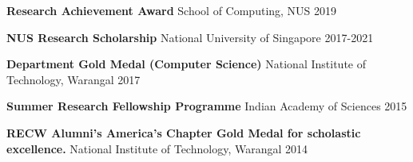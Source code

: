 



\begin{cvhonors}

  \cvhonor
    {\textbf{Research Achievement Award}} %
    {School of Computing, NUS} %
    {} %
    {2019} %

  \cvhonor
    {\textbf{NUS Research Scholarship}} %
    {National University of Singapore} %
    {} %
    {2017-2021} %

  \cvhonor
    {\textbf{Department Gold Medal (Computer Science) }} %
    {National Institute of Technology, Warangal} %
    {} %
    {2017} %

  \cvhonor
    {\textbf{Summer Research Fellowship Programme}} %
    {Indian Academy of Sciences} %
    {} %
    {2015} %

  \cvhonor
    {\textbf{RECW Alumni's America's Chapter Gold Medal for scholastic excellence.}} %
    {National Institute of Technology, Warangal} %
    {} %
    {2014} %


\end{cvhonors}
